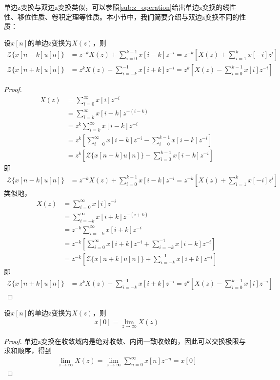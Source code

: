 单边z变换与双边z变换类似，可以参照\ref{sub:z_operation}给出单边z变换的线性性、移位性质、卷积定理等性质。本小节中，我们简要介绍与双边z变换不同的性质：
\begin{proposition}[单边z变换的移位性质]
    设$x[n]$的单边z变换为$X(z)$，则\begin{align*}
    \mathcal{Z}\{x[n-k]u[n]\}&=z^{-k}X(z)+\sum_{i=0}^{k-1}x[i-k]z^{-i}=z^{-k}\left[X(z)+\sum_{i=1}^{k}x[-i]z^{i}\right]\\
    \mathcal{Z}\{x[n+k]u[n]\}&=z^{k}X(z)-\sum_{i=-k}^{-1}x[i+k]z^{-i}=z^{k}\left[X(z)-\sum_{i=0}^{k-1}x[i]z^{-i}\right]
    \end{align*}
\end{proposition}
\begin{proof}
    \begin{align*}
        X(z)&=\sum_{i=0}^{\infty}x[i]z^{-i}\\
        &=\sum_{i=k}^{\infty}x[i-k]z^{-(i-k)}\\
        &=z^{k}\sum_{i=k}^{\infty}x[i-k]z^{-i}\\
        &=z^{k}\left[\sum_{i=0}^{\infty}x[i-k]z^{-i}-\sum_{i=0}^{k-1}x[i-k]z^{-i}\right]\\
        &=z^{k}\left[\mathcal{Z}\{x[n-k]u[n]\}-\sum_{i=0}^{k-1}x[i-k]z^{-i}\right]
    \end{align*}
    即\begin{align*}
    \mathcal{Z}\{x[n-k]u[n]\}&=z^{-k}X(z)+\sum_{i=0}^{k-1}x[i-k]z^{-i}=z^{-k}\left[X(z)+\sum_{i=1}^{k}x[-i]z^{i}\right]
    \end{align*}
    类似地，\begin{align*}
        X(z)&=\sum_{i=0}^{\infty}x[i]z^{-i}\\
        &=\sum_{i=-k}^{\infty}x[i+k]z^{-(i+k)}\\
        &=z^{-k}\sum_{i=-k}^{\infty}x[i+k]z^{-i}\\
        &=z^{-k}\left[\sum_{i=0}^{\infty}x[i+k]z^{-i}+\sum_{i=-k}^{-1}x[i+k]z^{-i}\right]\\
        &=z^{-k}\left[\mathcal{Z}\{x[n+k]u[n]\}+\sum_{i=-k}^{-1}x[i+k]z^{-i}\right]
    \end{align*}
    即\begin{align*}
    \mathcal{Z}\{x[n+k]u[n]\}&=z^{k}X(z)-\sum_{i=-k}^{-1}x[i+k]z^{-i}=z^{k}\left[X(z)-\sum_{i=0}^{k-1}x[i]z^{-i}\right]
    \end{align*}
\end{proof}

\begin{theorem}[单边z变换的初值定理]
    设$x[n]$的单边z变换为$X(z)$，则\begin{align*}
    x[0]=\lim_{z\to\infty}X(z)
    \end{align*}
\end{theorem}
\begin{proof}
    单边z变换在收敛域内是绝对收敛、内闭一致收敛的，因此可以交换极限与求和顺序，得到\begin{align*}
    \lim_{z\to\infty}X(z)=\lim_{z\to\infty}\sum_{n=0}^{\infty}x[n]z^{-n}=x[0]
    \end{align*}
\end{proof}

